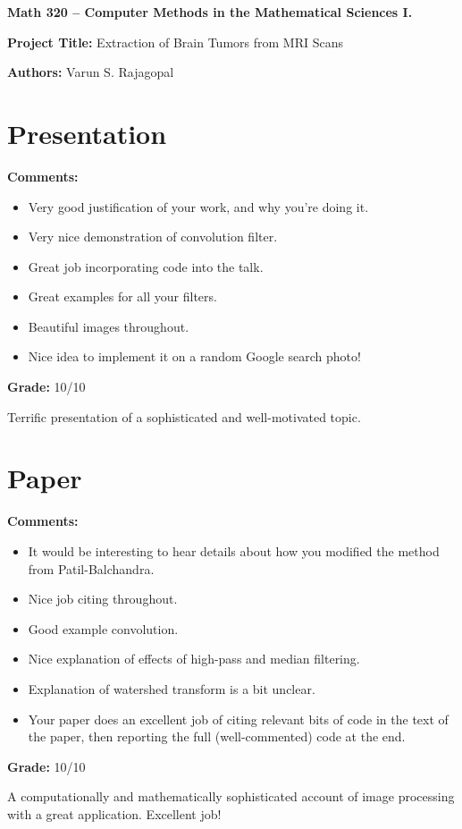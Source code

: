\documentclass[12pt]{article}
\begin{document}
{\bf \large Math 320 -- Computer Methods in the Mathematical Sciences I.}\\

\vspace{3mm}

{\bf \large Project Title:} Extraction of Brain Tumors from MRI Scans\\
\vspace{2mm}

{\bf \large Authors:} Varun S. Rajagopal\\

\vspace{3mm}

\section{Presentation}
{\bf \large Comments:}
\begin{itemize}
\item Very good justification of your work, and why you're doing it.
\item Very nice demonstration of convolution filter.
\item Great job incorporating code into the talk.
\item Great examples for all your filters.
\item Beautiful images throughout.
\item Nice idea to implement it on a random Google search photo!
\end{itemize}

{\bf \large Grade:} 10/10

Terrific presentation of a sophisticated and well-motivated topic.

\section{Paper}

{\bf \large Comments:}
\begin{itemize}
\item It would be interesting to hear details about how you modified
the method from Patil-Balchandra.
\item Nice job citing throughout.
\item Good example convolution.
\item Nice explanation of effects of high-pass and median filtering.
\item Explanation of watershed transform is a bit unclear.
\item Your paper does an excellent job of citing relevant bits of code
in the text of the paper, then reporting the full (well-commented) code
at the end.
\end{itemize}

{\bf \large Grade:} 10/10

A computationally and mathematically sophisticated account of image
processing with a great application. Excellent job!
\end{document}
